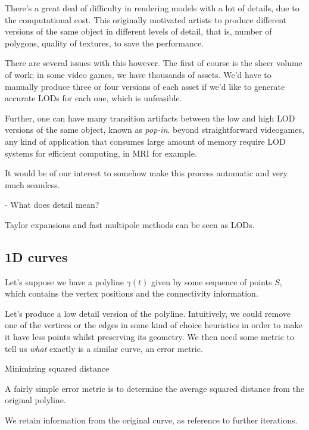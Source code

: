 There's a great deal of difficulty in rendering models
with a lot of details, due to the computational cost.
This originally motivated artists to produce 
different versions of the same object in different
levels of detail, that is, number of polygons,
quality of textures, to save the performance.

There are several issues with this however. The 
first of course is the sheer volume of work; in
some video games, we have thousands of assets. 
We'd have to manually produce three or four versions
of each asset if we'd like to generate accurate LODs
for each one, which is unfeasible.

Further, one can have many transition artifacts
between the low and high LOD versions of the same
object, known as \emph{pop-in}. beyond
straightforward videogames, any kind of
application that consumes large amount of memory
require LOD systems for efficient computing,
in MRI for example.

It would be of our interest to somehow make this
process automatic and very much seamless.

\begin{itemize}
    - What does detail mean?

\end{itemize}

Taylor expansions and fast multipole methods
can be seen as LODs.

\subsection{1D curves}

Let's suppose we have a polyline
$\gamma(t)$ given by some sequence of points
$S$, which contains the vertex positions 
and the connectivity information.

Let's produce a low detail version of the
polyline. Intuitively, we could remove one 
of the vertices or the edges in some kind 
of choice heuristics in order to make it
have less points whilst preserving its 
geometry. We then need some metric to 
tell us \emph{what} exactly is
a similar curve, an error metric.


Minimizing squared distance

A fairly simple error metric is to determine
the average squared distance from the original
polyline.



We retain information from the original
curve, as reference to further iterations.


